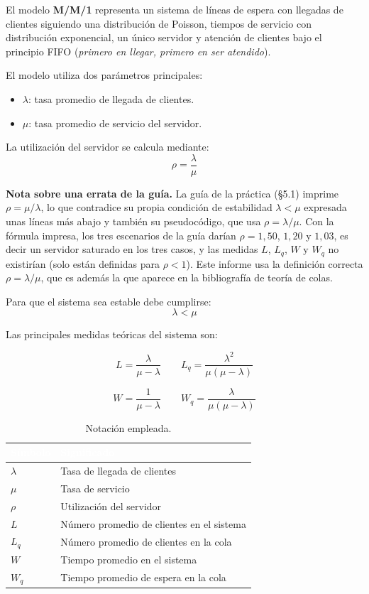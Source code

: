 \documentclass[11pt,a4paper]{article}
\renewcommand{\arraystretch}{1.08}
\begin{document}
El modelo \textbf{M/M/1} representa un sistema de líneas de espera con llegadas de
clientes siguiendo una distribución de Poisson, tiempos de servicio con distribución
exponencial, un único servidor y atención de clientes bajo el principio FIFO
(\emph{primero en llegar, primero en ser atendido}).

El modelo utiliza dos parámetros principales:
\begin{itemize}
    \item $\lambda$: tasa promedio de llegada de clientes.
    \item $\mu$: tasa promedio de servicio del servidor.
\end{itemize}

La utilización del servidor se calcula mediante:
\[
\rho = \frac{\lambda}{\mu}
\]

\noindent\textbf{Nota sobre una errata de la guía.} La guía de la práctica (§5.1) imprime
$\rho = \mu/\lambda$, lo que contradice su propia condición de estabilidad
$\lambda < \mu$ expresada unas líneas más abajo y también su pseudocódigo, que usa
$\rho = \lambda/\mu$. Con la fórmula impresa, los tres escenarios de la guía darían
$\rho = 1{,}50$, $1{,}20$ y $1{,}03$, es decir un servidor saturado en los tres casos, y
las medidas $L$, $L_q$, $W$ y $W_q$ no existirían (solo están definidas para
$\rho < 1$). Este informe usa la definición correcta $\rho = \lambda/\mu$, que es
además la que aparece en la bibliografía de teoría de colas.

Para que el sistema sea estable debe cumplirse:
\[
\lambda < \mu
\]

Las principales medidas teóricas del sistema son:

\[
L = \frac{\lambda}{\mu-\lambda} \qquad
L_q = \frac{\lambda^2}{\mu(\mu-\lambda)}
\]

\[
W = \frac{1}{\mu-\lambda} \qquad
W_q = \frac{\lambda}{\mu(\mu-\lambda)}
\]

\begin{table}[h!]
\centering
\setlength{\arrayrulewidth}{0.75pt}
\renewcommand{\arraystretch}{1.25}
\begin{tabular}{|l|l|}
\hline
\rowcolor{headerblue}
\textbf{\textcolor{white}{Símbolo}} & \textbf{\textcolor{white}{Significado}} \\ \hline
$\lambda$ & Tasa de llegada de clientes \\ \hline
\rowcolor{rowlight}
$\mu$ & Tasa de servicio \\ \hline
$\rho$ & Utilización del servidor \\ \hline
\rowcolor{rowlight}
$L$ & Número promedio de clientes en el sistema \\ \hline
$L_q$ & Número promedio de clientes en la cola \\ \hline
\rowcolor{rowlight}
$W$ & Tiempo promedio en el sistema \\ \hline
$W_q$ & Tiempo promedio de espera en la cola \\ \hline
\end{tabular}
\caption{Notación empleada.}
\end{table}
\end{document}

